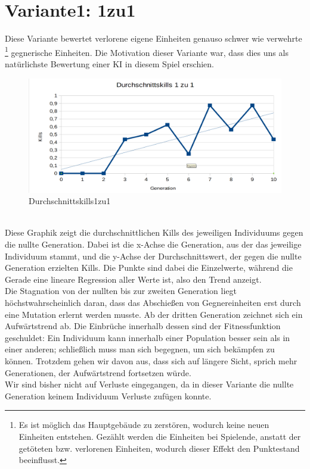 \documentclass[
	12pt,
	a4paper,
	BCOR10mm,
	DIV14,
	headsepline,
	usegeometry,
]{scrreprt}
\begin{document}
\section{Variante1: 1zu1}
Diese Variante bewertet verlorene eigene Einheiten genauso schwer wie verwehrte \footnote{Es ist möglich das Hauptgebäude zu zerstören, wodurch keine neuen Einheiten entstehen. Gezählt werden die Einheiten bei Spielende, anstatt der getöteten bzw. verlorenen Einheiten, wodurch dieser Effekt den Punktestand beeinflusst.} gegnerische Einheiten. Die Motivation dieser Variante war, dass dies uns als natürlichste Bewertung einer KI in diesem Spiel erschien.
\begin{figure}[h]
	\includegraphics[width = \textwidth]{Durchschnittskills1zu1.png}
	\caption{Durchschnittskills1zu1}
	\label{Durchschnittskills1zu1}
\end{figure}\\
Diese Graphik zeigt die durchschnittlichen Kills des jeweiligen Individuums gegen die nullte Generation. Dabei ist die x-Achse die Generation, aus der das jeweilige Individuum stammt, und die y-Achse der Durchschnittswert, der gegen die nullte Generation erzielten Kills. Die Punkte sind dabei die Einzelwerte, während die Gerade eine lineare Regression aller Werte ist, also den Trend anzeigt.\\
Die Stagnation von der nullten bis zur zweiten Generation liegt höchstwahrscheinlich daran, dass das Abschießen von Gegnereinheiten erst durch eine Mutation erlernt werden musste. Ab der dritten Generation zeichnet sich ein Aufwärtstrend ab. Die Einbrüche innerhalb dessen sind der Fitnessfunktion geschuldet: Ein Individuum kann innerhalb einer Population besser sein als in einer anderen; schließlich muss man sich begegnen, um sich bekämpfen zu können. Trotzdem gehen wir davon aus, dass sich auf längere Sicht, sprich mehr Generationen, der Aufwärtstrend fortsetzen würde.\\
Wir sind bisher nicht auf Verluste eingegangen, da in dieser Variante die nullte Generation keinem Individuum Verluste zufügen konnte.
\end{document}
